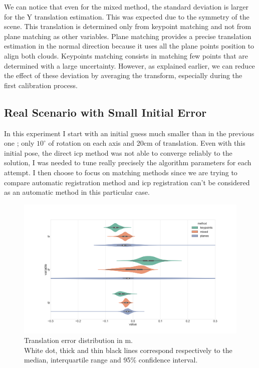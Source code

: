 We can notice that even for the mixed method, the standard deviation is larger for the Y translation estimation. This was expected due to the symmetry of the scene. This translation is determined only from keypoint matching and not from plane matching as other variables. Plane matching provides a precise translation estimation in the normal direction because it uses all the plane points position to align both clouds. Keypoints matching consists in matching few points that are determined with a large uncertainty.
However, as explained earlier, we can reduce the effect of these deviation by averaging the transform, especially during the first calibration process.

\subsection{Real Scenario with Small Initial Error}

In this experiment I start with an initial guess much smaller than in the previous one ; only $10^\circ$ of rotation on each axis and 20cm of translation. Even with this initial pose, the direct \acrshort{icp} method was not able to converge reliably to the solution, I was needed to tune really precisely the algorithm parameters for each attempt. I then choose to focus on matching methods since we are trying to compare automatic registration method and \acrshort{icp} registration can't be considered as an automatic method in this particular case.

\begin{figure}[h]
    \centering
    \includegraphics[width=\textwidth]{images/t_comp_small.png}
    \caption{Translation error distribution in m.\\White dot, thick and thin black lines correspond respectively to the median, interquartile range and 95\% confidence interval.}
    \label{fig:t_com}
\end{figure}

